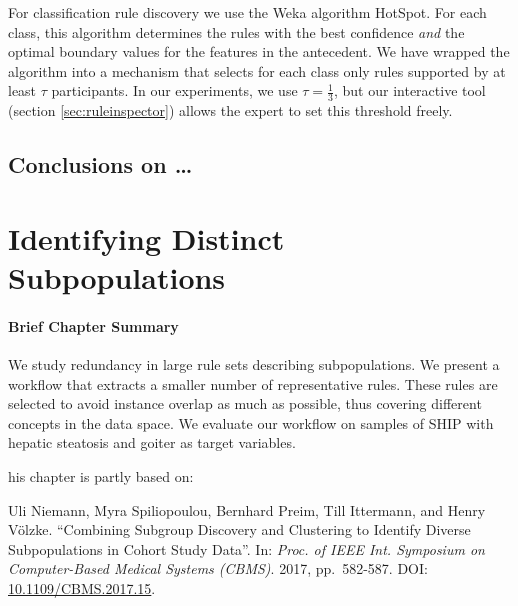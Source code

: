 \documentclass[
  oneside]{book}
\newenvironment{infobox}[1]
  {
  \begin{chapter-summary}
  }
  {
  \end{chapter-summary}
  }
\begin{document}
For classification rule discovery we use the Weka algorithm HotSpot. For each class, this algorithm determines the rules with the best confidence \emph{and} the optimal boundary values for the features in the antecedent. We have wrapped the algorithm into a mechanism that selects for each class only rules supported by at least \(\tau\) participants. In our experiments, we use \(\tau=\frac{1}{3}\), but our interactive tool (section \ref{sec:ruleinspector}) allows the expert to set this threshold freely.

\hypertarget{conclusions-on}{%
\section{Conclusions on \ldots{}}\label{conclusions-on}}

\autocite{qing2020improved}

\hypertarget{sdclu}{%
\chapter{Identifying Distinct Subpopulations}\label{sdclu}}

\begin{infobox}{tasks.pdf}

\hypertarget{brief-chapter-summary-1}{%
\subsubsection*{Brief Chapter Summary}\label{brief-chapter-summary-1}}

We study redundancy in large rule sets describing subpopulations.
We present a workflow that extracts a smaller number of representative rules.
These rules are selected to avoid instance overlap as much as possible, thus covering different concepts in the data space.
We evaluate our workflow on samples of SHIP with hepatic steatosis and goiter as target variables.

\end{infobox}

\begin{infobox}

This chapter is partly based on:

Uli Niemann, Myra Spiliopoulou, Bernhard Preim, Till Ittermann, and
Henry Völzke. ``Combining Subgroup Discovery and Clustering to Identify
Diverse Subpopulations in Cohort Study Data''. In: \emph{Proc. of IEEE Int.
Symposium on Computer-Based Medical Systems (CBMS)}. 2017, pp.~582-587.
DOI: \href{https://doi.org/10.1109\%2FCBMS.2017.15}{10.1109/CBMS.2017.15}.

\end{infobox}
\end{document}
